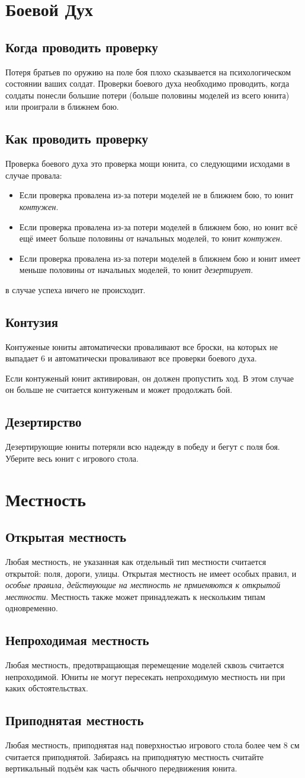 \documentclass[twocolumn]{article}
\newcommand{\ssec}[1]{\section{#1}\label{sec:#1}}
\newcommand{\subsec}[1]{\subsection{#1}\label{subsec:#1}}
\begin{document}
\newpage

\ssec{Боевой Дух}
\subsec{Когда проводить проверку}
Потеря братьев по оружию на поле боя плохо сказывается на психологическом состоянии ваших солдат. Проверки боевого духа необходимо проводить, когда солдаты понесли большие потери (больше половины моделей из всего юнита) или проиграли в ближнем бою.

\subsec{Как проводить проверку}
Проверка боевого духа это проверка мощи юнита, со следующими исходами в случае провала:
\begin{itemize}
    \item Если проверка провалена из-за потери моделей не в ближнем бою, то юнит \emph{контужен}.
    \item Если проверка провалена из-за потери моделей в ближнем бою, но юнит всё ещё имеет больше половины от начальных моделей, то юнит \emph{контужен}.
    \item Если проверка провалена из-за потери моделей в ближнем бою и юнит имеет меньше половины от начальных моделей, то юнит \emph{дезертирует}.
\end{itemize}
в случае успеха ничего не происходит.

\subsec{Контузия}
Контуженые юниты автоматически проваливают все броски, на которых не выпадает 6 и автоматически проваливают все проверки боевого духа.

Если контуженый юнит активирован, он должен пропустить ход. В этом случае он больше не считается контуженым и может продолжать бой.

\subsec{Дезертирство}
Дезертирующие юниты потеряли всю надежду в победу и бегут с поля боя. Уберите весь юнит с игрового стола.

\newpage

\ssec{Местность}
\subsec{Открытая местность}
Любая местность, не указанная как отдельный тип местности считается открытой: поля, дороги, улицы. Открытая местность не имеет особых правил, и \emph{особые правила, действующие на местность не прмиеняются к открытой местности}. Местность также может принадлежать к нескольким типам одновременно.

\subsec{Непроходимая местность}
Любая местность, предотвращающая перемещение моделей сквозь считается непроходимой. Юниты не могут пересекать непроходимую местность ни при каких обстоятельствах.

\subsec{Приподнятая местность}
Любая местность, приподнятая над поверхностью игрового стола более чем 8 см считается приподнятой. Забираясь на приподнятую местность считайте вертикальный подъём как часть обычного передвижения юнита.
\end{document}
